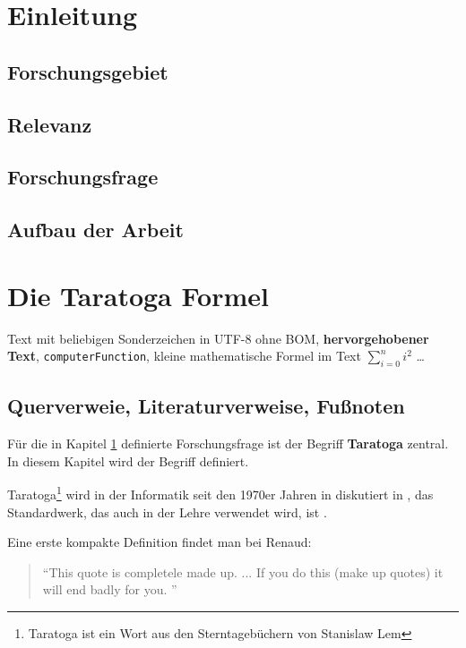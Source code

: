 \newcommand{\mkbibnodate}{n\adddot d\adddot}
\section{Einleitung}
\label{section:Einleitung}

\subsection{Forschungsgebiet}
\subsection{Relevanz}
\subsection{Forschungsfrage}
\subsection{Aufbau der Arbeit}

\section{Die Taratoga Formel}

Text mit beliebigen Sonderzeichen in UTF-8 ohne BOM, 
\textbf{hervorgehobener Text},
\texttt{computerFunction}, kleine mathematische Formel im Text $\sum_{i=0}^n i^2$
\ldots

\subsection{Querverweie, Literaturverweise, Fußnoten}
Für die in Kapitel \ref{section:Einleitung} definierte Forschungsfrage
ist der Begriff \textbf{Taratoga} zentral. In diesem Kapitel wird
der Begriff definiert.

Taratoga\footnote{Taratoga ist ein Wort aus den Sterntagebüchern von Stanislaw Lem} wird in der Informatik
seit den 1970er Jahren in diskutiert in \autocites{McConnell:2004}{Vandevoorde:2002},
das Standardwerk, das auch in der Lehre verwendet wird, ist 
\autocite{Tanenbaum:2003}.

Eine erste kompakte Definition findet man bei Renaud: 

\begin{quote}
``This quote is completele made up. ... If you do this (make up quotes)
it will end badly for you. ''
\autocite[S.305]{Renaud:2004}
\end{quote}

